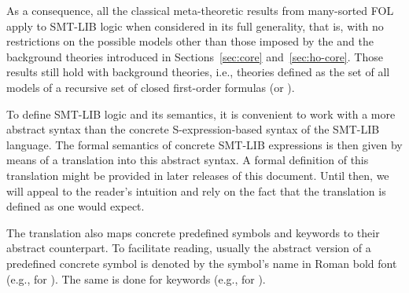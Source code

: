 As a consequence, all the classical meta-theoretic results from many-sorted 
FOL apply to SMT-LIB logic when considered in its full generality, that is,
with no restrictions on the possible models other than those imposed 
by the  and the  background theories introduced 
in Sections~\ref{sec:core} and~\ref{sec:ho-core}.
Those results still hold with  
background theories, i.e., theories defined as the set of all models
of a recursive set of closed first-order formulas (or ).
\medskip

To define SMT-LIB logic and its semantics, it is convenient to work 
with a more abstract syntax than the concrete S-expression-based syntax 
of the SMT-LIB language.
The formal semantics of concrete SMT-LIB expressions is then given by means 
of a translation into this abstract syntax.
A formal definition of this translation might be provided in later releases 
of this document.
Until then, we will appeal to the reader's intuition and rely on the fact that 
the translation is defined as one would expect.

The translation also maps concrete predefined symbols and keywords
to their abstract counterpart.
To facilitate reading, usually the abstract version of 
a predefined concrete symbol is denoted by the symbol's name 
in Roman bold font (e.g.,  for ).
The same is done for keywords (e.g.,  for ).

